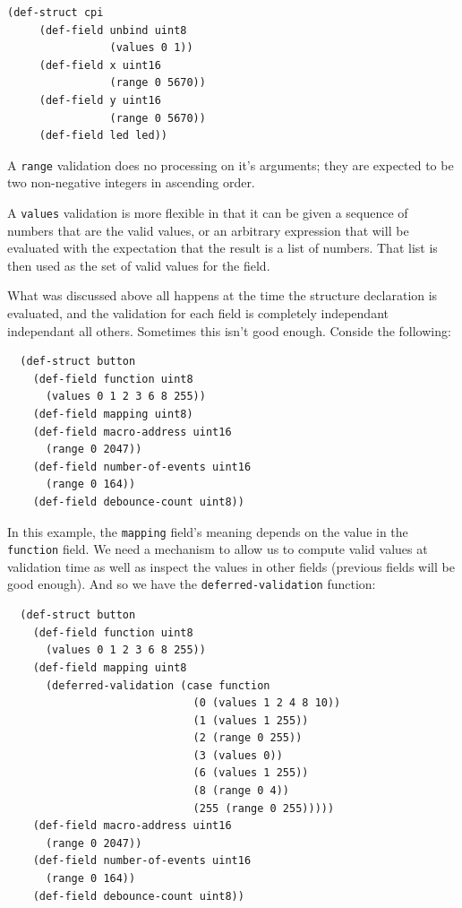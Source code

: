 \documentclass[12pt]{article}
\begin{document}
\begin{verbatim}
(def-struct cpi
     (def-field unbind uint8
                (values 0 1))
     (def-field x uint16
                (range 0 5670))
     (def-field y uint16
                (range 0 5670))
     (def-field led led))
\end{verbatim}

A \verb|range| validation does no processing on it's arguments; they
are expected to be two non-negative integers in ascending order.

A \verb|values| validation is more flexible in that it can be given a
sequence of numbers that are the valid values, or an
arbitrary expression that will be evaluated with the expectation that
the result is a list of numbers. That list is then used as the set of
valid values for the field.

What was discussed above all happens at the time the structure
declaration is evaluated, and the validation for each field is
completely independant independant all others. Sometimes this isn't
good enough. Conside the following:


\begin{verbatim}
  (def-struct button
    (def-field function uint8
      (values 0 1 2 3 6 8 255))
    (def-field mapping uint8)
    (def-field macro-address uint16
      (range 0 2047))
    (def-field number-of-events uint16
      (range 0 164))
    (def-field debounce-count uint8))
\end{verbatim}

In this example, the \verb|mapping| field's meaning depends on the
value in the \verb|function| field. We need a mechanism to allow us to
compute valid values at validation time as well as inspect the values
in other fields (previous fields will be good enough). And so we have
the \verb|deferred-validation| function:

\begin{verbatim}
  (def-struct button
    (def-field function uint8
      (values 0 1 2 3 6 8 255))
    (def-field mapping uint8
      (deferred-validation (case function
                             (0 (values 1 2 4 8 10))
                             (1 (values 1 255))
                             (2 (range 0 255))
                             (3 (values 0))
                             (6 (values 1 255))
                             (8 (range 0 4))
                             (255 (range 0 255)))))
    (def-field macro-address uint16
      (range 0 2047))
    (def-field number-of-events uint16
      (range 0 164))
    (def-field debounce-count uint8))
\end{verbatim}
\end{document}
